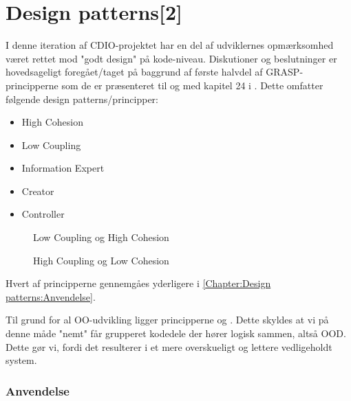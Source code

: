 \chapter{Design patterns[2]}\label{Chapter:Design patterns}
I denne iteration af CDIO-projektet \cite{CDIOdel2} har en del af udviklernes opmærksomhed været rettet mod "godt design" på kode-niveau. Diskutioner og beslutninger er hovedsageligt foregået/taget på baggrund af første halvdel af GRASP-principperne som de er præsenteret til og med kapitel 24 i \cite{umlbook}. Dette omfatter følgende design patterns/principper: 

\begin{itemize}
	\item High Cohesion    
	\item Low Coupling
	\item Information Expert
	\item Creator
	\item Controller
\end{itemize}

\begin{figure}
\caption{Low Coupling og High Cohesion}
\label{fig:lowCoupling}
\centering

\end{figure}

\begin{figure}
\caption{High Coupling og Low Cohesion}
\label{fig:highCoupling}
\centering

\end{figure}

Hvert af principperne gennemgåes yderligere i \vref{Chapter:Design patterns:Anvendelse}.

Til grund for al OO-udvikling ligger principperne  og . Dette skyldes at vi på denne måde "nemt" får grupperet kodedele der hører logisk sammen, altså OOD. Dette gør vi, fordi det resulterer i et mere overskueligt og lettere vedligeholdt system.
 
\subsection{Anvendelse}\label{Chapter:Design patterns:Anvendelse}


